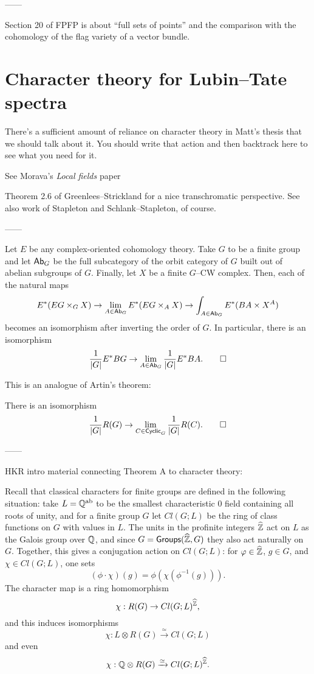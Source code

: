 ------

Section 20 of FPFP is about ``full sets of points'' and the comparison with the cohomology of the flag variety of a vector bundle.






\section{Character theory for Lubin--Tate spectra}

There's a sufficient amount of reliance on character theory in Matt's thesis that we should talk about it.  You should write that action and then backtrack here to see what you need for it.

See Morava's \textit{Local fields} paper

\begin{remark}
Theorem 2.6 of Greenlees--Strickland for a nice transchromatic perspective.  See also work of Stapleton and Schlank--Stapleton, of course.
\end{remark}


------

\begin{theorem}
Let $E$ be any complex-oriented cohomology theory.  Take $G$ to be a finite group and let $\mathsf{Ab}_G$ be the full subcategory of the orbit category of $G$ built out of abelian subgroups of $G$.  Finally, let $X$ be a finite $G$--CW complex.  Then, each of the natural maps \[E^*(EG \times_G X) \to \lim_{A \in \mathsf{Ab}_G} E^*(EG \times_A X) \to \int_{A \in \mathsf{Ab}_G} E^*(BA \times X^A)\] becomes an isomorphism after inverting the order of $G$.  In particular, there is an isomorphism \[\frac{1}{|G|} E^* BG \to \lim_{A \in \mathsf{Ab}_G} \frac{1}{|G|} E^* BA. \qed\]
\end{theorem}

This is an analogue of Artin's theorem:
\begin{theorem}
There is an isomorphism \[\frac{1}{|G|} R(G) \to \lim_{C \in \mathsf{Cyclic}_G} \frac{1}{|G|} R(C). \qed\]
\end{theorem}


------

HKR intro material connecting Theorem A to character theory:

Recall that classical characters for finite groups are defined in the following situation: take $L = \mathbb{Q}^{\mathrm{ab}}$ to be the smallest characteristic $0$ field containing all roots of unity, and for a finite group $G$ let $Cl(G; L)$ be the ring of class functions on $G$ with values in $L$.  The units in the profinite integers $\widehat{\mathbb Z}$ act on $L$ as the Galois group over $\mathbb{Q}$, and since $G = \mathsf{Groups}(\widehat{\mathbb Z}, G)$ they also act naturally on $G$.  Together, this gives a conjugation action on $Cl(G; L)$: for $\varphi \in \widehat{\mathbb Z}$, $g \in G$, and $\chi \in Cl(G; L)$, one sets \[(\phi \cdot \chi)(g) = \phi(\chi(\phi^{-1}(g))).\]  The character map is a ring homomorphism \[\chi: R(G) \to Cl(G; L)^{\widehat{\mathbb Z}},\] and this induces isomorphisms \[\chi: L \otimes R(G) \xrightarrow{\simeq} Cl(G; L)\] and even \[\chi: \mathbb{Q} \otimes R(G) \xrightarrow{\simeq} Cl(G; L)^{\widehat{\mathbb Z}}.\]

